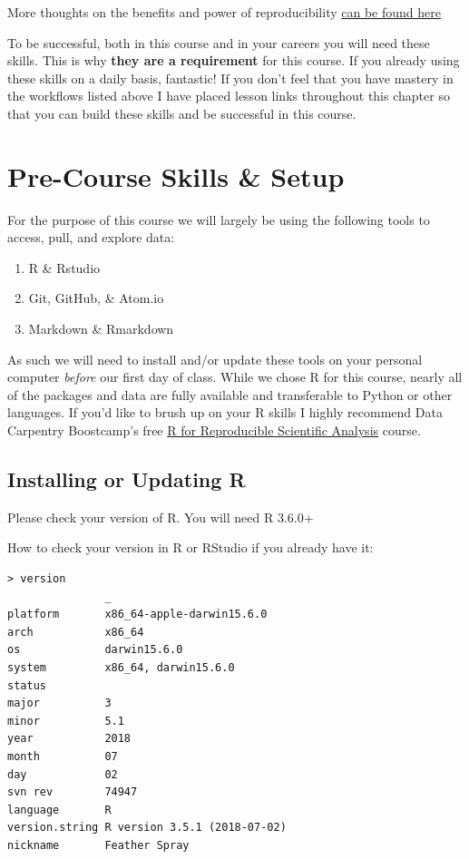 \documentclass[]{book}
\providecommand{\tightlist}{%
  \setlength{\itemsep}{0pt}\setlength{\parskip}{0pt}}
\begin{document}
More thoughts on the benefits and power of reproducibility \href{https://github.com/katharynduffy/ECOSS_reproducible_science}{can be found here}

To be successful, both in this course and in your careers you will need these skills. This is why \textbf{they are a requirement} for this course. If you already using these skills on a daily basis, fantastic! If you don't feel that you have mastery in the workflows listed above I have placed lesson links throughout this chapter so that you can build these skills and be successful in this course.

\hypertarget{pre-course-skills-setup}{%
\section{Pre-Course Skills \& Setup}\label{pre-course-skills-setup}}

For the purpose of this course we will largely be using the following tools to access, pull, and explore data:

\begin{enumerate}
\def\labelenumi{\arabic{enumi}.}
\tightlist
\item
  R \& Rstudio
\item
  Git, GitHub, \& Atom.io
\item
  Markdown \& Rmarkdown
\end{enumerate}

As such we will need to install and/or update these tools on your personal computer \emph{before} our first day of class. While we chose R for this course, nearly all of the packages and data are fully available and transferable to Python or other languages. If you'd like to brush up on your R skills I highly recommend Data Carpentry Boostcamp's free \href{http://swcarpentry.github.io/r-novice-gapminder}{R for Reproducible Scientific Analysis} course.

\hypertarget{installing-or-updating-r}{%
\subsection{Installing or Updating R}\label{installing-or-updating-r}}

Please check your version of R. You will need R 3.6.0+

How to check your version in R or RStudio if you already have it:

\begin{verbatim}
> version
               _                           
platform       x86_64-apple-darwin15.6.0   
arch           x86_64                      
os             darwin15.6.0                
system         x86_64, darwin15.6.0        
status                                     
major          3                           
minor          5.1                         
year           2018                        
month          07                          
day            02                          
svn rev        74947                       
language       R                           
version.string R version 3.5.1 (2018-07-02)
nickname       Feather Spray  
\end{verbatim}
\end{document}
